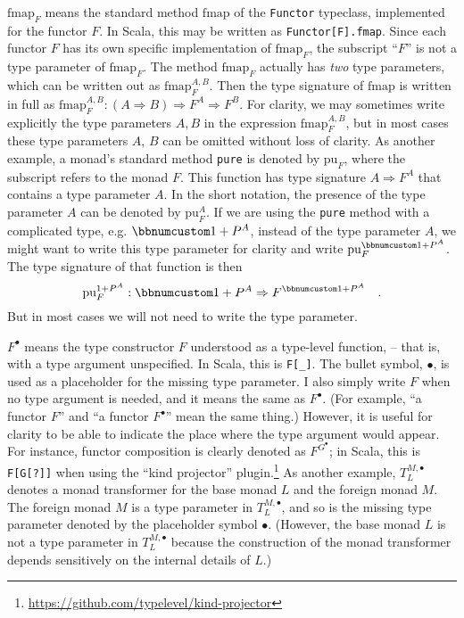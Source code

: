 $\text{fmap}_{F}$ means the standard method $\text{fmap}$ of the
\lstinline!Functor! typeclass,
implemented for the functor $F$. In Scala, this may be written as
\texttt{}\lstinline!Functor[F].fmap!.
Since each functor $F$ has its own specific implementation of $\text{fmap}_{F}$,
the subscript ``$F$'' is not a type parameter of $\text{fmap}_{F}$.
The method $\text{fmap}_{F}$ actually has \emph{two} type parameters,
which can be written out as $\text{fmap}_{F}^{A,B}$. Then the type
signature of $\text{fmap}$ is written in full as $\text{fmap}_{F}^{A,B}:\left(A\Rightarrow B\right)\Rightarrow F^{A}\Rightarrow F^{B}$.
For clarity, we may sometimes write explicitly the type parameters
$A,B$ in the expression $\text{fmap}_{F}^{A,B}$, but in most cases
these type parameters $A$, $B$ can be omitted without loss of clarity.
As another example, a monad's standard method \lstinline!pure!
is denoted by $\text{pu}_{F}$, where the subscript refers to the
monad $F$. This function has type signature $A\Rightarrow F^{A}$
that contains a type parameter $A$. In the short notation, the presence
of the type parameter $A$ can be denoted by $\text{pu}_{F}^{A}$.
If we are using the \lstinline!pure!
method with a complicated type, e.g. $\bbnum 1+P^{A}$, instead of
the type parameter $A$, we might want to write this type parameter
for clarity and write $\text{pu}_{F}^{\bbnum 1+P^{A}}$. The type
signature of that function is then 
\[
\text{pu}_{F}^{1+P^{A}}:\bbnum 1+P^{A}\Rightarrow F^{\bbnum 1+P^{A}}\quad.
\]
But in most cases we will not need to write the type parameter.

$F^{\bullet}$ means the type constructor $F$ understood as a type-level
function, – that is, with a type argument unspecified. In Scala, this
is \lstinline!F[_]!. The
bullet symbol, $\bullet$, is used as a placeholder for the missing
type parameter. I also simply write $F$ when no type argument is
needed, and it means the same as $F^{\bullet}$. (For example, ``a
functor $F$'' and ``a functor $F^{\bullet}$'' mean the same thing.)
However, it is useful for clarity to be able to indicate the place
where the type argument would appear. For instance, functor composition
is clearly denoted as $F^{G^{\bullet}}$; in Scala, this is \texttt{}\lstinline!F[G[?]]!
when using the ``kind projector'' plugin.\footnote{\href{https://github.com/typelevel/kind-projector}{https://github.com/typelevel/kind-projector}}
As another example, $T_{L}^{M,\bullet}$ denotes a monad transformer
for the base monad $L$ and the foreign monad $M$. The foreign monad
$M$ is a type parameter in $T_{L}^{M,\bullet}$, and so is the missing
type parameter denoted by the placeholder symbol $\bullet$. (However,
the base monad $L$ is not a type parameter in $T_{L}^{M,\bullet}$
because the construction of the monad transformer depends sensitively
on the internal details of $L$.)

